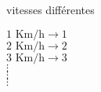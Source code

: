 \documentclass[12pt]{beamer}
\begin{document}
\begin{frame}{vitesses différentes}
    \begin{center}
    
        $\text{1 Km/h} \longrightarrow 1$\\
        \vspace{0.5cm}
        $\text{2 Km/h} \longrightarrow 2$\\
        \vspace{0.5cm}
        $\text{3 Km/h} \longrightarrow 3$\\
        \Huge $\vdots$\\
        \Huge $\vdots$\\
        \Huge $\vdots$\\
    \end{center}
\end{frame}
\end{document}

